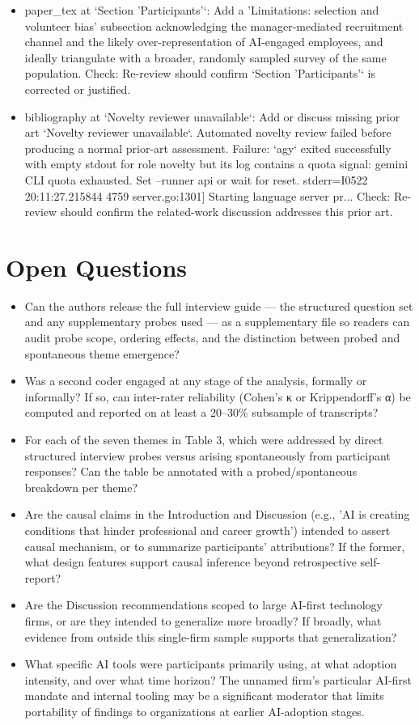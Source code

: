 \documentclass[11pt]{article}
\begin{document}
\begin{itemize}[leftmargin=*]
  \item [open] paper\_tex at `Section 'Participants'`: Add a 'Limitations: selection and volunteer bias' subsection acknowledging the manager-mediated recruitment channel and the likely over-representation of AI-engaged employees, and ideally triangulate with a broader, randomly sampled survey of the same population. Check: Re-review should confirm `Section 'Participants'` is corrected or justified.
  \item [open] bibliography at `Novelty reviewer unavailable`: Add or discuss missing prior art `Novelty reviewer unavailable`. Automated novelty review failed before producing a normal prior-art assessment. Failure: `agy` exited successfully with empty stdout for role novelty but its log contains a quota signal: gemini CLI quota exhausted. Set --runner api or wait for reset. stderr=I0522 20:11:27.215844  4759 server.go:1301] Starting language server pr... Check: Re-review should confirm the related-work discussion addresses this prior art.
\end{itemize}

\section*{Open Questions}
\begin{itemize}[leftmargin=*]
  \item Can the authors release the full interview guide — the structured question set and any supplementary probes used — as a supplementary file so readers can audit probe scope, ordering effects, and the distinction between probed and spontaneous theme emergence?
  \item Was a second coder engaged at any stage of the analysis, formally or informally? If so, can inter-rater reliability (Cohen's κ or Krippendorff's α) be computed and reported on at least a 20–30\% subsample of transcripts?
  \item For each of the seven themes in Table 3, which were addressed by direct structured interview probes versus arising spontaneously from participant responses? Can the table be annotated with a probed/spontaneous breakdown per theme?
  \item Are the causal claims in the Introduction and Discussion (e.g., 'AI is creating conditions that hinder professional and career growth') intended to assert causal mechanism, or to summarize participants' attributions? If the former, what design features support causal inference beyond retrospective self-report?
  \item Are the Discussion recommendations scoped to large AI-first technology firms, or are they intended to generalize more broadly? If broadly, what evidence from outside this single-firm sample supports that generalization?
  \item What specific AI tools were participants primarily using, at what adoption intensity, and over what time horizon? The unnamed firm's particular AI-first mandate and internal tooling may be a significant moderator that limits portability of findings to organizations at earlier AI-adoption stages.
\end{itemize}
\end{document}
